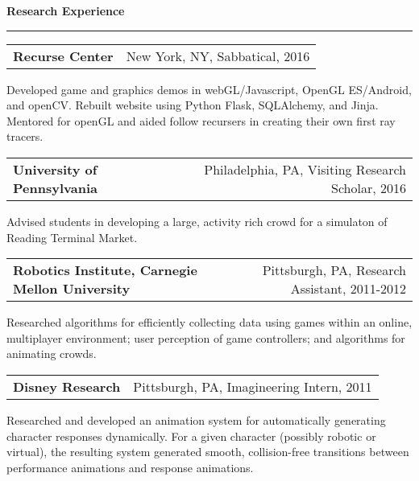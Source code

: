{\Large {\bf Research Experience}} 
\vspace{0.1cm}
\hrule
\medskip

\begin{tabular*}{7.1in}{@{}l@{\extracolsep\fill}r}
{\large {\bf Recurse Center}} & New York, NY, Sabbatical, 2016\\
\end{tabular*}
Developed game and graphics demos in webGL/Javascript, OpenGL ES/Android, and openCV. Rebuilt website using Python Flask, SQLAlchemy, and Jinja. Mentored for openGL and aided follow recursers in creating their own first ray tracers.

\medskip

\begin{tabular*}{7.1in}{@{}l@{\extracolsep\fill}r}
{\large {\bf University of Pennsylvania}} & Philadelphia, PA, Visiting Research Scholar, 2016\\
\end{tabular*}
Advised students in developing a large, activity rich crowd for a simulaton of Reading Terminal Market.

\medskip

\begin{tabular*}{7.1in}{@{}l@{\extracolsep\fill}r}
{\large {\bf Robotics Institute, Carnegie Mellon University}} & Pittsburgh, PA, Research Assistant, 2011-2012\\
\end{tabular*}

Researched algorithms for efficiently collecting data using games within an online, multiplayer environment; user perception of game controllers; and algorithms for animating crowds. 
\medskip

\begin{tabular*}{7.1in}{@{}l@{\extracolsep\fill}r}
{\large {\bf Disney Research}} & Pittsburgh, PA, Imagineering Intern, 2011\\
\end{tabular*}

Researched and developed an animation system for automatically generating character responses dynamically. 
For a given character (possibly robotic or virtual), the resulting system generated 
smooth, collision-free transitions between performance animations and response animations.


